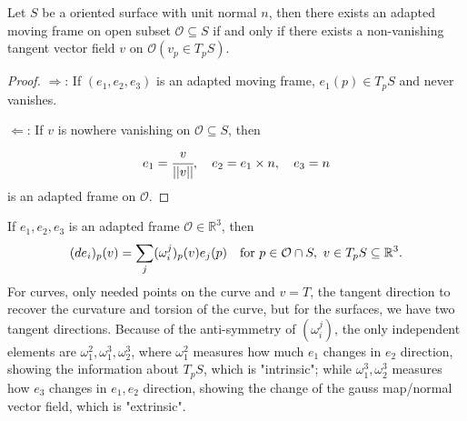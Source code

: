 \documentclass[10pt]{article}
\begin{document}
		\begin{lemma}
			Let $S$ be a oriented surface with unit normal $n$, then there exists an adapted moving frame on open subset $\mathcal{O}\subseteq S$ if and only if there exists a non-vanishing tangent vector field $v$ on $\mathcal{O}(v_p\in T_pS)$.
		\end{lemma}
		
		\begin{proof}
			$\Longrightarrow$: If $(e_1, e_2, e_3)$ is an adapted moving frame, $e_1(p)\in T_pS$ and never vanishes.
			
			$\Longleftarrow$: If $v$ is nowhere vanishing on $\mathcal{O}\subseteq S$, then
			\begin{equation*}
				\begin{aligned}
					e_1 = \cfrac{v}{||v||}, \quad e_2 = e_1\times n, \quad e_3 = n
				\end{aligned}
			\end{equation*}
			is an adapted frame on $\mathcal{O}$.
		\end{proof}

		If $e_1, e_2, e_3$ is an adapted frame $\mathcal{O}\in\mathbb{R}^3$, then
		\begin{equation*}
			\begin{aligned}
				(de_i)_p(v) = \sum\limits_j(\omega_i^j)_p(v)e_j(p)\quad\text{for}\thinspace\thinspace p\in\mathcal{O}\cap S,\thinspace\thinspace v\in T_pS\subseteq\mathbb{R}^3.
			\end{aligned}
		\end{equation*}
		For curves, only needed points on the curve and $v=T$, the tangent direction to recover the curvature and torsion of the curve, but for the surfaces, we have two tangent directions. Because of the anti-symmetry of $(\omega_i^j)$, the only independent elements are $\omega_1^2, \omega_1^3, \omega_2^3$, where $\omega_1^2$ measures how much $e_1$ changes in $e_2$ direction, showing the information about $T_pS$, which is "intrinsic"; while $\omega_1^3, \omega_2^3$ measures how $e_3$ changes in $e_1, e_2$ direction, showing the change of the gauss map/normal vector field, which is "extrinsic".

            
\end{document}

